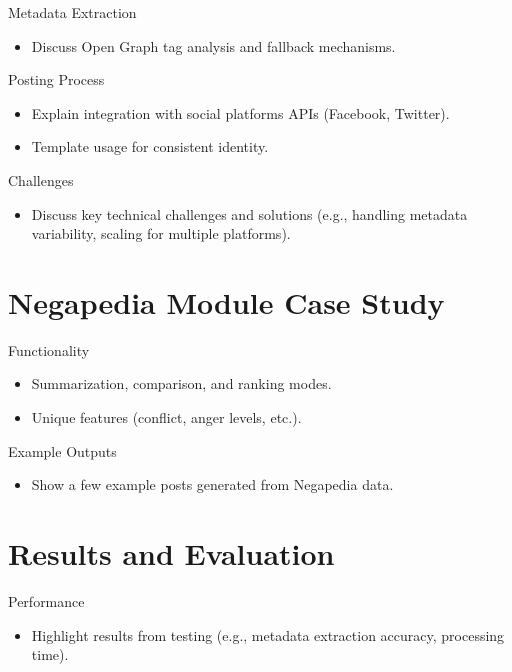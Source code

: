 \documentclass{beamer}
\begin{document}
    \begin{frame}{Metadata Extraction}
        \begin{itemize}
            \item Discuss Open Graph tag analysis and fallback mechanisms.
        \end{itemize}
    \end{frame}

    \begin{frame}{Posting Process}
        \begin{itemize}
            \item Explain integration with social platforms APIs (Facebook, Twitter).
            \item Template usage for consistent identity.
        \end{itemize}
    \end{frame}

    \begin{frame}{Challenges}
        \begin{itemize}
            \item Discuss key technical challenges and solutions (e.g., handling metadata variability, scaling for multiple platforms).
        \end{itemize}
    \end{frame}


\section{Negapedia Module Case Study}
    \begin{frame}{Functionality}
        \begin{itemize}
            \item Summarization, comparison, and ranking modes.
            \item Unique features (conflict, anger levels, etc.).
        \end{itemize}
    \end{frame}

    \begin{frame}{Example Outputs}
        \begin{itemize}
            \item Show a few example posts generated from Negapedia data.
        \end{itemize}
    \end{frame}


\section{Results and Evaluation}
    \begin{frame}{Performance}
        \begin{itemize}
            \item Highlight results from testing (e.g., metadata extraction accuracy, processing time).
        \end{itemize}
    \end{frame}
\end{document}
